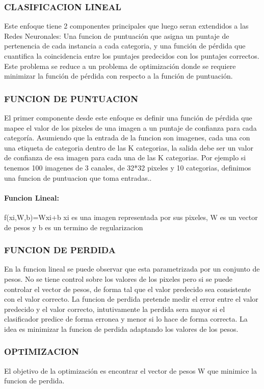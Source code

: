 \documentclass[a4paper,10pt]{article}
\begin{document}
\subsubsection{CLASIFICACION LINEAL}
Este enfoque tiene 2 componentes principales que luego seran extendidos a las Redes Neuronales: Una funcion de puntuación que asigna un puntaje de pertenencia de cada instancia a cada categoria, 
y una función de pérdida que cuantifica la coincidencia entre los puntajes predecidos con los puntajes correctos.
Este problema se reduce a un problema de optimización donde se requiere minimizar la función de pérdida con respecto a la función de puntuación.


\subsubsection{FUNCION DE PUNTUACION}
El primer componente desde este enfoque es definir una función de pérdida que mapee el valor de los pixeles de una imagen a un puntaje de confianza para cada categoría.
Asumiendo que la entrada de la funcion son imagenes, cada una con una etiqueta de categoria dentro de las K categorias, la salida debe ser un valor de confianza de esa imagen 
para cada una de las K categorias.
Por ejemplo si tenemos 100 imagenes de 3 canales, de 32*32 pixeles y 10 categorias, definimos una funcion de puntuacion que toma entradas..

\paragraph{Funcion Lineal:} 
f(xi,W,b)=Wxi+b
xi es una imagen representada por sus pixeles, W es un vector de pesos y b es un termino de regularizacion

\subsubsection{FUNCION DE PERDIDA}
En la funcion lineal se puede observar que esta parametrizada por un conjunto de pesos.
No se tiene control sobre los valores de los pixeles pero si se puede controlar el vector de pesos, de forma tal que el valor predecido sea consistente con el valor correcto. 
La funcion de perdida pretende medir el error entre el valor predecido y el valor correcto, intutivamente la perdida sera mayor si el clasificador predice de forma erronea y 
menor si lo hace de forma correcta.
La idea es minimizar la funcion de perdida adaptando los valores de los pesos.

\subsubsection{OPTIMIZACION}
El objetivo de la optimización es encontrar el vector de pesos W que minimice la funcion de perdida.
\end{document}
